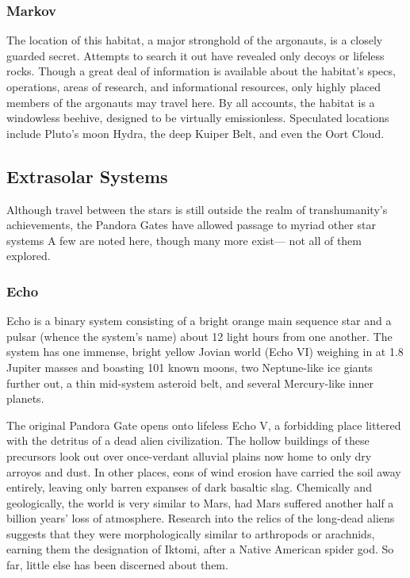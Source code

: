 \subsubsection{Markov}

The location of this habitat, a major stronghold of 
the argonauts, is a closely guarded secret. Attempts to 
search it out have revealed only decoys or lifeless rocks. 
Though a great deal of information is available about 
the habitat's specs, operations, areas of research, and 
informational resources, only highly placed members 
of the argonauts may travel here. By all accounts, the 
habitat is a windowless beehive, designed to be virtually 
emissionless. Speculated locations include Pluto's moon 
Hydra, the deep Kuiper Belt, and even the Oort Cloud.

\subsection{Extrasolar Systems}

Although travel between the stars is still outside the 
realm of transhumanity's achievements, the Pandora 
Gates have allowed passage to myriad other star systems
A few are noted here, though many more exist—
not all of them explored.

\subsubsection{Echo}

Echo is a binary system consisting of a bright orange 
main sequence star and a pulsar (whence the system's 
name) about 12 light hours from one another. The 
system has one immense, bright yellow Jovian world 
(Echo VI) weighing in at 1.8 Jupiter masses and boasting
101 known moons, two Neptune-like ice giants
further out, a thin mid-system asteroid belt, and several 
Mercury-like inner planets.

The original Pandora Gate opens onto lifeless Echo V, a forbidding
place littered with the detritus of a dead alien civilization. The
hollow buildings of these precursors look out over once-verdant 
alluvial plains now home to only dry arroyos and dust. In other 
places, eons of wind erosion have carried the soil away entirely, 
leaving only barren expanses of dark basaltic slag. Chemically and 
geologically, the world is very similar to Mars, had Mars suffered 
another half a billion years' loss of atmosphere. Research into the 
relics of the long-dead aliens suggests that they were morphologically
similar to arthropods or arachnids, earning them the designation
of Iktomi, after a Native American spider god. So far, little else
has been discerned about them.

